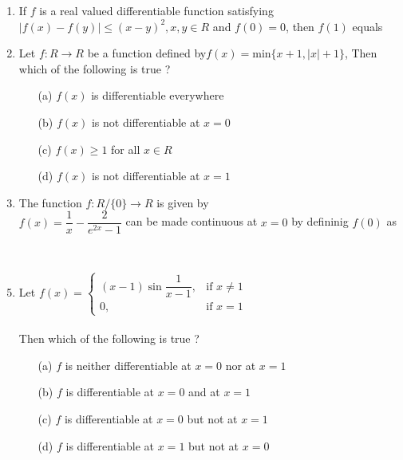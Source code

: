 \documentclass[journal,12pt,twocolumn]{IEEEtran}
\begin{document}
\begin{enumerate}
\item If $f$ is a real valued differentiable function satisfying $|f(x)-f(y)|\leq (x-y)^2, x, y \in R$ and $f(0)=0$, then $f(1)$ equals
\begin{itemize}
\end{itemize}

\item Let $f:R \to R$ be a function defined by$f(x)=$min$\{x+1,|x|+1\}$, Then which of the following is true ?
\begin{itemize}
\item[(a)] $f(x)$ is differentiable everywhere
\item[(b)] $f(x)$ is not differentiable at $x=0$
\item[(c)] $f(x)\geq 1$ for all $x \in R$
\item[(d)] $f(x)$ is not differentiable at $x=1$\\
\end{itemize}

\item The function $f:R/\{0\} \to R$ is given by\\
$f(x)=\dfrac{1}{x}-\dfrac{2}{e^{2x}-1}$ can be made continuous at $x=0$ by defininig $f(0)$ as
\begin{itemize}
\end{itemize} \item[~]

\item Let $f(x)=\begin{cases}
(x-1)\sin\dfrac{1}{x-1}, &\text{if $x\neq 1$}\\
0, &\text{if $x=1$}
\end{cases}$ \\ \\Then which of the following is true ?
\begin{itemize}
\item[(a)] $f$ is neither differentiable at $x=0$ nor at $x=1$
\item[(b)] $f$ is differentiable at $x=0$ and at $x=1$
\item[(c)] $f$ is differentiable at $x=0$ but not at $x=1$
\item[(d)] $f$ is differentiable at $x=1$ but not at $x=0$\\
\end{itemize}


\end{enumerate}
\end{document}
